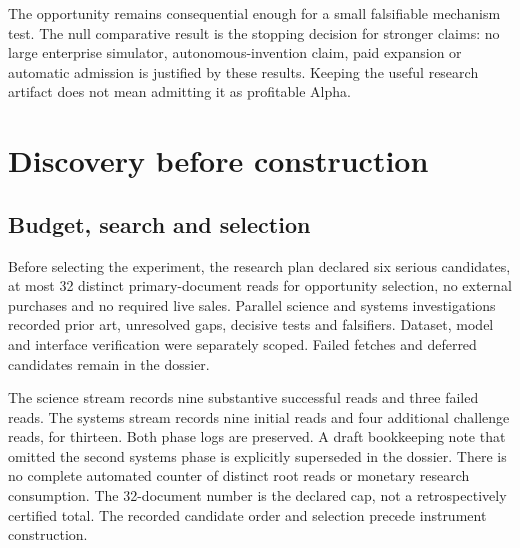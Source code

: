 The opportunity remains consequential enough for a small falsifiable mechanism test. The null comparative result is the stopping decision for stronger claims: no large enterprise simulator, autonomous-invention claim, paid expansion or automatic admission is justified by these results. Keeping the useful research artifact does not mean admitting it as profitable Alpha.

\section{Discovery before construction}

\subsection{Budget, search and selection}

Before selecting the experiment, the research plan declared six serious candidates, at most 32 distinct primary-document reads for opportunity selection, no external purchases and no required live sales. Parallel science and systems investigations recorded prior art, unresolved gaps, decisive tests and falsifiers. Dataset, model and interface verification were separately scoped. Failed fetches and deferred candidates remain in the dossier.

The science stream records nine substantive successful reads and three failed reads. The systems stream records nine initial reads and four additional challenge reads, for thirteen. Both phase logs are preserved. A draft bookkeeping note that omitted the second systems phase is explicitly superseded in the dossier. There is no complete automated counter of distinct root reads or monetary research consumption. The 32-document number is the declared cap, not a retrospectively certified total. The recorded candidate order and selection precede instrument construction.

